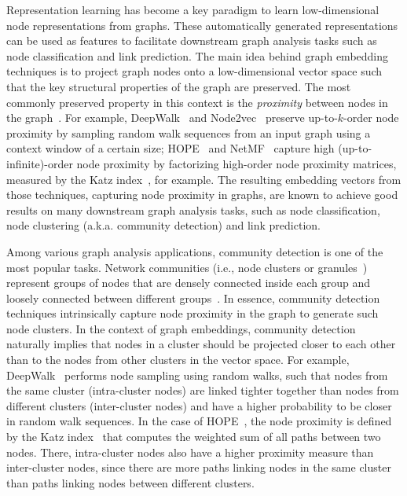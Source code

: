 \documentclass[conference]{IEEEtran}
\begin{document}
Representation learning has become a key paradigm to learn low-dimensional node representations from graphs. These automatically generated representations can be used as features to facilitate downstream graph analysis tasks such as node classification and link prediction. The main idea behind graph embedding techniques is to project graph nodes onto a low-dimensional vector space such that the key structural properties of the graph are preserved. The most commonly preserved property in this context is the \emph{proximity} between nodes in the graph~\cite{cai2018comprehensive}. For example, DeepWalk~\cite{Dpwk14} and Node2vec~\cite{nd2v16} preserve up-to-$k$-order node proximity by sampling random walk sequences from an input graph using a context window of a certain size; HOPE~\cite{Ou16} and NetMF~\cite{qiu2018network} capture high (up-to-infinite)-order node proximity by factorizing high-order node proximity matrices, measured by the Katz index~\cite{Katz53}, for example. The resulting embedding vectors from those techniques, capturing node proximity in graphs, are known to achieve good results on many downstream graph analysis tasks, such as node classification, node clustering (a.k.a. community detection) and link prediction.

Among various graph analysis applications, community detection is one of the most popular tasks.
Network communities (i.e., node clusters or granules~\cite{YaoY00})
represent groups of nodes that are
densely connected inside each group and
loosely connected between different groups~\cite{Newm03}.  In essence, community detection techniques intrinsically capture node proximity in the graph to generate such node clusters.
In the context of graph embeddings, community detection naturally implies that nodes in a cluster should be projected closer to each other than to the nodes from other clusters in the vector space. For example, DeepWalk~\cite{Dpwk14} performs node sampling using random walks, such that nodes from the same cluster (intra-cluster nodes) are linked tighter together than nodes from different clusters (inter-cluster nodes) and have a higher probability to be closer in random walk sequences.
In the case of HOPE~\cite{Ou16}, the node proximity is defined by the Katz index~\cite{Katz53} that computes the weighted sum of all paths between two nodes. There, intra-cluster nodes also have a higher proximity measure than inter-cluster nodes, 
since there are more paths linking nodes in the same cluster than paths linking nodes between different clusters.
\end{document}
